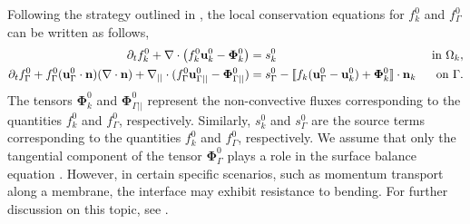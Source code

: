 Following the strategy outlined in \citep{ishii2010thermo,bothe2022sharp}, the local conservation equations for $f_k^0$ and $f_\Gamma^0$ can be written as follows,
\begin{align}
    \label{eq:dt_f_k}
    \pddt f_k^0
    +\div \left(
        f_k^0\textbf{u}_k^0
        - \mathbf{\Phi}_k^0
        \right)
    &= 
    s_k^0
    & \text{ in } \Omega_k,&\\
    \pddt f_\Gamma^0 
    + f_\Gamma^0 (\textbf{u}_\Gamma^0 \cdot \textbf{n})(\div \textbf{n})
    +\divI
    (f_\Gamma^0 \textbf{u}_{\Gamma||}^0
        - \mathbf{\Phi}_{\Gamma||}^0 )
    &= 
    s_\Gamma^0
    - \Jump{
       f_k (\textbf{u}_\Gamma^0 - \textbf{u}_k^0)
       + \mathbf{\Phi}_k^0
    } 
    & \text{ on } \Gamma.&
    \label{eq:dt_f_I}
\end{align}
The tensors $\mathbf{\Phi}_k^0$ and $\mathbf{\Phi}_{\Gamma||}^0$ represent the non-convective fluxes corresponding to the quantities $f_k^0$ and $f_\Gamma^0$, respectively. Similarly, $s_k^0$ and $s_\Gamma^0$ are the source terms corresponding to the quantities $f_k^0$ and $f_\Gamma^0$, respectively. We assume that only the tangential component of the tensor $\mathbf{\Phi}_{\Gamma}^0$ plays a role in the surface balance equation \citep{bothe2022sharp}. However, in certain specific scenarios, such as momentum transport along a membrane, the interface may exhibit resistance to bending. For further discussion on this topic, see \citet{jaensson2021}. %
